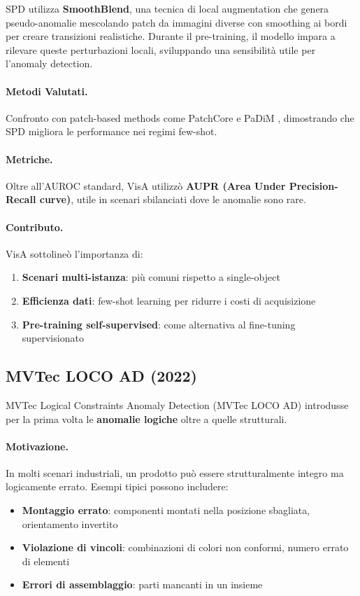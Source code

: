 SPD utilizza \textbf{SmoothBlend}, una tecnica di local augmentation che genera pseudo-anomalie mescolando patch da immagini diverse con smoothing ai bordi per creare transizioni realistiche. Durante il pre-training, il modello impara a rilevare queste perturbazioni locali, sviluppando una sensibilità utile per l'anomaly detection.

\paragraph{Metodi Valutati.} Confronto con patch-based methods come PatchCore \cite{roth2022towards} e PaDiM \cite{defard2021padim}, dimostrando che SPD migliora le performance nei regimi few-shot.

\paragraph{Metriche.} Oltre all'AUROC standard, VisA utilizzò \textbf{AUPR (Area Under Precision-Recall curve)}, utile in scenari sbilanciati dove le anomalie sono rare.

\paragraph{Contributo.} VisA sottolineò l'importanza di:
\begin{enumerate}
\item \textbf{Scenari multi-istanza}: più comuni rispetto a single-object
\item \textbf{Efficienza dati}: few-shot learning per ridurre i costi di acquisizione
\item \textbf{Pre-training self-supervised}: come alternativa al fine-tuning supervisionato
\end{enumerate}

\subsection{MVTec LOCO AD (2022)}
\label{sec:mvtec_loco}
MVTec Logical Constraints Anomaly Detection (MVTec LOCO AD) \cite{bergmann2022beyond} introdusse per la prima volta le \textbf{anomalie logiche} oltre a quelle strutturali.

\paragraph{Motivazione.} In molti scenari industriali, un prodotto può essere strutturalmente integro ma logicamente errato. Esempi tipici possono includere:
\begin{itemize}
\item \textbf{Montaggio errato}: componenti montati nella posizione sbagliata, orientamento invertito
\item \textbf{Violazione di vincoli}: combinazioni di colori non conformi, numero errato di elementi
\item \textbf{Errori di assemblaggio}: parti mancanti in un insieme
\end{itemize}


